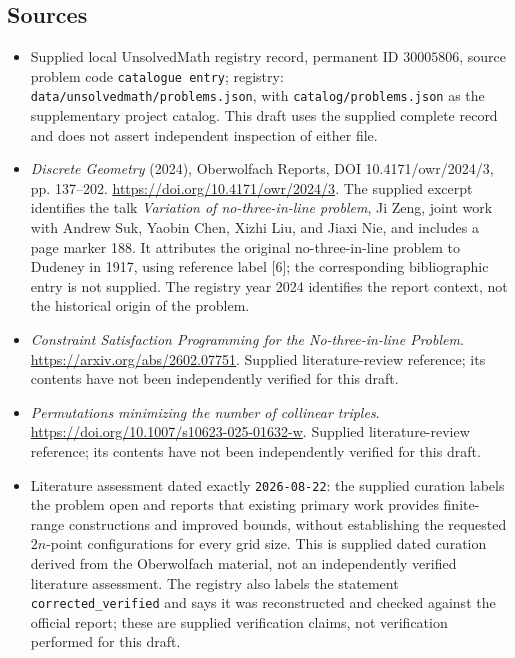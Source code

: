\documentclass[11pt]{article}
\begin{document}
\subsection{Sources}
\begin{itemize}
\item Supplied local UnsolvedMath registry record, permanent ID \(30005806\), source problem code \texttt{catalogue entry}; registry: \texttt{data/unsolvedmath/problems.json}, with \texttt{catalog/problems.json} as the supplementary project catalog. This draft uses the supplied complete record and does not assert independent inspection of either file.
\item \emph{Discrete Geometry} (2024), Oberwolfach Reports, DOI 10.4171/owr/2024/3, pp. 137--202. \url{https://doi.org/10.4171/owr/2024/3}. The supplied excerpt identifies the talk \emph{Variation of no-three-in-line problem}, Ji Zeng, joint work with Andrew Suk, Yaobin Chen, Xizhi Liu, and Jiaxi Nie, and includes a page marker 188. It attributes the original no-three-in-line problem to Dudeney in 1917, using reference label [6]; the corresponding bibliographic entry is not supplied. The registry year 2024 identifies the report context, not the historical origin of the problem.
\item \emph{Constraint Satisfaction Programming for the No-three-in-line Problem}. \url{https://arxiv.org/abs/2602.07751}. Supplied literature-review reference; its contents have not been independently verified for this draft.
\item \emph{Permutations minimizing the number of collinear triples}. \url{https://doi.org/10.1007/s10623-025-01632-w}. Supplied literature-review reference; its contents have not been independently verified for this draft.
\item Literature assessment dated exactly \texttt{2026-08-22}: the supplied curation labels the problem open and reports that existing primary work provides finite-range constructions and improved bounds, without establishing the requested \(2n\)-point configurations for every grid size. This is supplied dated curation derived from the Oberwolfach material, not an independently verified literature assessment. The registry also labels the statement \texttt{corrected\_verified} and says it was reconstructed and checked against the official report; these are supplied verification claims, not verification performed for this draft.
\end{itemize}
\end{document}
